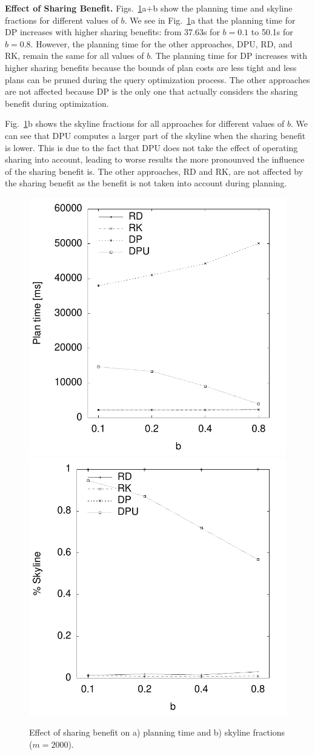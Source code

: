 \textbf{Effect of Sharing Benefit.} Figs.~\ref{fig:pareto_sharing}a+b
show the planning time and skyline fractions for different values of
$b$. We see in Fig.~\ref{fig:pareto_sharing}a that the planning time
for DP increases with higher sharing benefits: from 37.63s for $b=0.1$
to 50.1s for $b=0.8$. However, the planning time for the other
approaches, DPU, RD, and RK, remain the same for all values of
$b$. The planning time for DP increases with higher sharing benefits
because the bounds of plan costs are less tight and less plans can be
pruned during the query optimization process. The other approaches are
not affected because DP is the only one that actually considers the
sharing benefit during optimization.

Fig.~\ref{fig:pareto_sharing}b shows the skyline fractions for all
approaches for different values of $b$. We can see that DPU computes a
larger part of the skyline when the sharing benefit is lower. This is
due to the fact that DPU does not take the effect of operating sharing
into account, leading to worse results the more pronounved the
influence of the sharing benefit is. The other approaches, RD and RK,
are not affected by the sharing benefit as the benefit is not taken
into account during planning.

\begin{figure}[htb]
  \centering
  \includegraphics[width=0.49\linewidth]{figs/pareto_plan_b.pdf}
  \includegraphics[width=0.49\linewidth]{figs/plans_skyline_by_b.pdf}
  \caption{Effect of sharing benefit on a) planning time and b)
    skyline fractions ($m=2000$).}
  \label{fig:pareto_sharing}
\end{figure}

